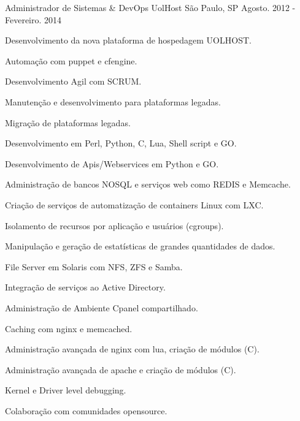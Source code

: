 \begin{cventries}
  \cventry
    {Administrador de Sistemas \& DevOps} %
    {UolHost} %
    {São Paulo, SP} %
    {Agosto. 2012 - Fevereiro. 2014} %
    {
      \begin{cvitems} %
          \item {Desenvolvimento da nova plataforma de hospedagem UOLHOST.}
          \item {Automação com puppet e cfengine.}
          \item {Desenvolvimento Agil com SCRUM.}
          \item {Manutenção e desenvolvimento para plataformas legadas.}
          \item {Migração de plataformas legadas.}
          \item {Desenvolvimento em Perl, Python, C, Lua, Shell script e GO.}
          \item {Desenvolvimento de Apis/Webservices em Python e GO.}
          \item {Administração de bancos NOSQL e serviços web como REDIS e Memcache.}
          \item {Criação de serviços de automatização de containers Linux com LXC.}
          \item {Isolamento de recursos por aplicação e usuários (cgroups).}
          \item {Manipulação e geração de estatísticas de grandes quantidades de dados.}
          \item {File Server em Solaris com NFS, ZFS e Samba.}
          \item {Integração de serviços ao Active Directory.}
          \item {Administração de Ambiente Cpanel compartilhado.}
          \item {Caching com nginx e memcached.}
          \item {Administração avançada de nginx com lua, criação de módulos (C).}
          \item {Administração avançada de apache e criação de módulos (C).}
          \item {Kernel e Driver level debugging.}
          \item {Colaboração com comunidades opensource.}
      \end{cvitems}
    }


\end{cventries}
